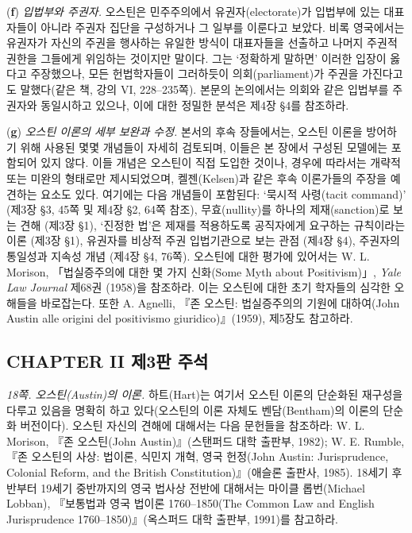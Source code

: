 \documentclass[12pt, oneside]{book}  %
\begin{document}
(\textbf{f}) \emph{입법부와 주권자.} 오스틴은 민주주의에서
유권자(electorate)가 입법부에 있는 대표자들이 아니라 주권자 집단을
구성하거나 그 일부를 이룬다고 보았다. 비록 영국에서는 유권자가 자신의
주권을 행사하는 유일한 방식이 대표자들을 선출하고 나머지 주권적 권한을
그들에게 위임하는 것이지만 말이다. 그는 `정확하게 말하면' 이러한 입장이
옳다고 주장했으나, 모든 헌법학자들이 그러하듯이 의회(parliament)가
주권을 가진다고도 말했다(같은 책, 강의 VI, 228--235쪽). 본문의
논의에서는 의회와 같은 입법부를 주권자와 동일시하고 있으나, 이에 대한
정밀한 분석은 제4장 §4를 참조하라.

(\textbf{g}) \emph{오스틴 이론의 세부 보완과 수정.} 본서의 후속
장들에서는, 오스틴 이론을 방어하기 위해 사용된 몇몇 개념들이 자세히
검토되며, 이들은 본 장에서 구성된 모델에는 포함되어 있지 않다. 이들
개념은 오스틴이 직접 도입한 것이나, 경우에 따라서는 개략적 또는 미완의
형태로만 제시되었으며, 켈젠(Kelsen)과 같은 후속 이론가들의 주장을
예견하는 요소도 있다. 여기에는 다음 개념들이 포함된다: `묵시적
사령(tacit command)' (제3장 §3, 45쪽 및 제4장 §2, 64쪽 참조),
무효(nullity)를 하나의 제재(sanction)로 보는 견해 (제3장 §1), `진정한
법'은 제재를 적용하도록 공직자에게 요구하는 규칙이라는 이론 (제3장 §1),
유권자를 비상적 주권 입법기관으로 보는 관점 (제4장 §4), 주권자의
통일성과 지속성 개념 (제4장 §4, 76쪽). 오스틴에 대한 평가에 있어서는 W.
L. Morison, 「법실증주의에 대한 몇 가지 신화(Some Myth about
Positivism)」, \emph{Yale Law Journal} 제68권 (1958)을 참조하라. 이는
오스틴에 대한 초기 학자들의 심각한 오해들을 바로잡는다. 또한 A. Agnelli,
『존 오스틴: 법실증주의의 기원에 대하여(John Austin alle origini del
positivismo giuridico)』(1959), 제5장도 참고하라.

\subsection{CHAPTER II 제3판
주석}\label{chapter-ii-uxc81c3uxd310-uxc8fcuxc11d}

\emph{18쪽. 오스틴(Austin)의 이론.} 하트(Hart)는 여기서 오스틴 이론의
단순화된 재구성을 다루고 있음을 명확히 하고 있다(오스틴의 이론 자체도
벤담(Bentham)의 이론의 단순화 버전이다). 오스틴 자신의 견해에 대해서는
다음 문헌들을 참조하라: W. L. Morison, 『존 오스틴(John
Austin)』(스탠퍼드 대학 출판부, 1982); W. E. Rumble, 『존 오스틴의 사상:
법이론, 식민지 개혁, 영국 헌정(John Austin: Jurisprudence, Colonial
Reform, and the British Constitution)』(애슬론 출판사, 1985). 18세기
후반부터 19세기 중반까지의 영국 법사상 전반에 대해서는 마이클
롭번(Michael Lobban), 『보통법과 영국 법이론 1760--1850(The Common Law
and English Jurisprudence 1760--1850)』(옥스퍼드 대학 출판부, 1991)를
참고하라.
\end{document}
